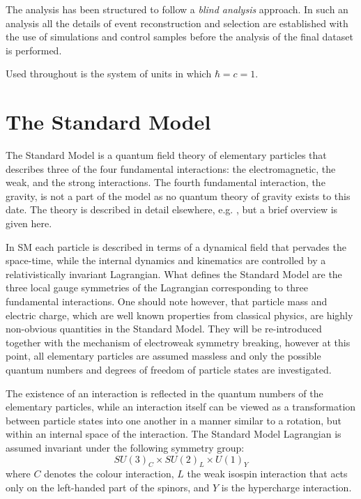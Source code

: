 The analysis has been structured to follow a {\it blind analysis} approach. In such an analysis
all the details of event reconstruction and selection are established 
with the use of simulations and control samples before
the analysis of the final dataset is performed.

Used throughout is the system of units in which $\hbar=c=1$.


\section{The Standard Model}

The Standard Model is a quantum field theory of elementary particles that describes 
three of the four fundamental interactions: 
the electromagnetic, the weak, and the strong interactions. The fourth fundamental
interaction, the gravity, 
is not a part of the model as no quantum theory of gravity exists to this date. 
The theory is described in detail elsewhere, e.g. \cite{Glashow:1961tr,Salam:1968rm,Tully:1417476}, 
but a brief overview is given here.

In SM each particle is described
in terms of a dynamical field that pervades the space-time, while the internal dynamics 
and kinematics are controlled by a relativistically invariant Lagrangian.
What defines the Standard Model are the three local gauge symmetries of the Lagrangian
corresponding to three fundamental interactions.
One should note however, that particle mass and electric charge, 
which are well known properties from 
classical physics, are highly non-obvious quantities in the Standard Model. They
will be re-introduced together with the mechanism of electroweak symmetry breaking, however
at this point,
all elementary particles are assumed massless and only the possible quantum numbers
and degrees of freedom of particle states are investigated.

The existence of an interaction is reflected in the quantum numbers of the elementary
particles, while an interaction itself can be viewed as a transformation between particle states
into one another in a manner similar to a rotation, but within an internal space of the interaction.
The Standard Model Lagrangian is assumed invariant under the following symmetry group:
\begin{equation}
SU(3)_C \times SU(2)_L \times U(1)_Y
\label{eqn:symSM}
\end{equation}
where $C$ denotes the colour interaction, $L$ the weak isospin interaction 
that acts only on the left-handed part of the spinors, and $Y$ is the hypercharge
interaction.

